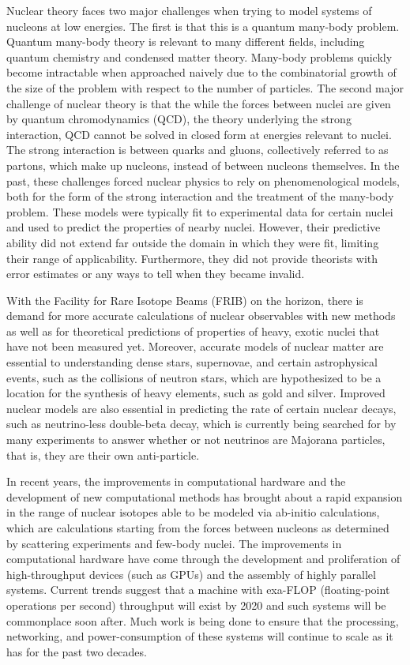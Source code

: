 Nuclear theory faces two major challenges when trying to model systems of nucleons at low energies. The first is that this is a quantum many-body problem. Quantum many-body theory is relevant to many different fields, including quantum chemistry and condensed matter theory. Many-body problems quickly become intractable when approached naively due to the combinatorial growth of the size of the problem with respect to the number of particles. The second major challenge of nuclear theory is that the while the forces between nuclei are given by quantum chromodynamics (QCD), the theory underlying the strong interaction, QCD cannot be solved in closed form at energies relevant to nuclei. The strong interaction is between quarks and gluons, collectively referred to as partons, which make up nucleons, instead of between nucleons themselves. In the past, these challenges forced nuclear physics to rely on phenomenological models, both for the form of the strong interaction and the treatment of the many-body problem. These models were typically fit to experimental data for certain nuclei and used to predict the properties of nearby nuclei. However, their predictive ability did not extend far outside the domain in which they were fit, limiting their range of applicability. Furthermore, they did not provide theorists with error estimates or any ways to tell when they became invalid.

With the Facility for Rare Isotope Beams (FRIB) on the horizon, there is demand for more accurate calculations of nuclear observables with new methods as well as for theoretical predictions of properties of heavy, exotic nuclei that have not been measured yet. Moreover, accurate models of nuclear matter are essential to understanding dense stars, supernovae, and certain astrophysical events, such as the collisions of neutron stars, which are hypothesized to be a location for the synthesis of heavy elements, such as gold and silver. Improved nuclear models are also essential in predicting the rate of certain nuclear decays, such as neutrino-less double-beta decay, which is currently being searched for by many experiments to answer whether or not neutrinos are Majorana particles, that is, they are their own anti-particle.

In recent years, the improvements in computational hardware and the development of new computational methods has brought about a rapid expansion in the range of nuclear isotopes able to be modeled via ab-initio calculations, which are calculations starting from the forces between nucleons as determined by scattering experiments and few-body nuclei. The improvements in computational hardware have come through the development and proliferation of high-throughput devices (such as GPUs) and the assembly of highly parallel systems. Current trends suggest that a machine with exa-FLOP (floating-point operations per second) throughput will exist by 2020 and such systems will be commonplace soon after. Much work is being done to ensure that the processing, networking, and power-consumption of these systems will continue to scale as it has for the past two decades. 

